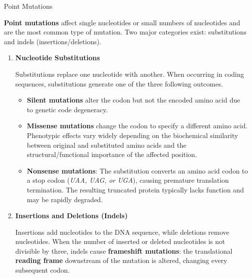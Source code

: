 \documentclass[10pt]{article}
\begin{document}
    \begin{core}{Point Mutations}

      \textbf{Point mutations} affect single nucleotides or small numbers of nucleotides and are the most common type of mutation. Two major categories exist: substitutions and indels (insertions/deletions).

      \begin{enumerate}

        \item \textbf{Nucleotide Substitutions}

        Substitutions replace one nucleotide with another. When occurring in coding sequences, substitutions generate one of the three following outcomes.

        \begin{itemize}

          \item \textbf{Silent mutations} alter the codon but not the encoded amino acid due to genetic code degeneracy. 


          \item \textbf{Missense mutations} change the codon to specify a different amino acid. Phenotypic effects vary widely depending on the biochemical similarity between original and substituted amino acids and the structural/functional importance of the affected position. 


          \item \textbf{Nonsense mutations}: The substitution converts an amino acid codon to a stop codon (\textit{UAA, UAG, or UGA}), causing premature translation termination. The resulting truncated protein typically lacks function and may be rapidly degraded.


        \end{itemize}

        \item \textbf{Insertions and Deletions (Indels)}

        Insertions add nucleotides to the DNA sequence, while deletions remove nucleotides. When the number of inserted or deleted nucleotides is not divisible by three, indels cause \textbf{frameshift mutations}: the translational \textbf{reading frame} downstream of the mutation is altered, changing every subsequent codon. 


\end{enumerate}
\end{core}
\end{document}
